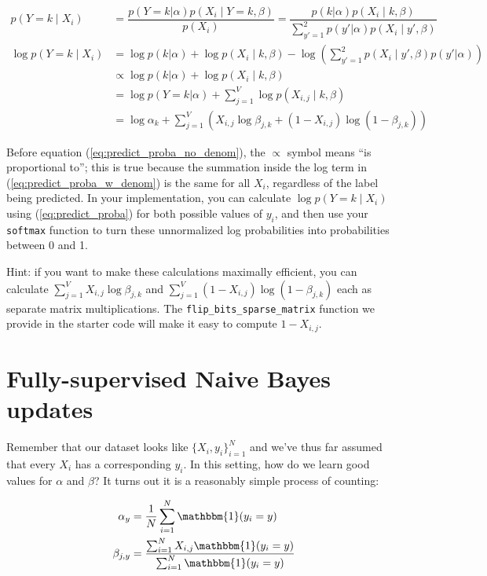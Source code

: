 \documentclass[12pt]{article}
\begin{document}
\begin{align}
p(Y=k \mid X_i) &= \dfrac{p(Y=k | \alpha)p(X_i \mid Y=k, \beta)}{p(X_i)}
= \dfrac{p(k | \alpha)p(X_i \mid k, \beta)}{\sum_{y'=1}^2 p(y' | \alpha)p(X_i \mid y', \beta)}
\label{eq:sup_prediction} \\[0.2em]
\log p(Y=k \mid X_i) &= \log p(k | \alpha) + \log p(X_i \mid k, \beta)  -
\log\left(\sum_{y'=1}^2 p(X_i \mid y', \beta)p(y' | \alpha)\right) \label{eq:predict_proba_w_denom} \\
&\propto \log p(k | \alpha) + \log p(X_i \mid k, \beta) \label{eq:predict_proba_no_denom} \\
&= \log p(Y=k | \alpha) + \sum_{j=1}^V \log p(X_{i,j} \mid k, \beta) \nonumber \\
&= \log \alpha_{k} + \sum_{j=1}^V \left(X_{i, j} \log \beta_{j, k} + (1 - X_{i, j}) \log (1 - \beta_{j, k}) \right)
\label{eq:predict_proba}
\end{align}

Before equation (\ref{eq:predict_proba_no_denom}), the $\propto$ symbol means
``is proportional to''; this is true because the summation inside the log term
in (\ref{eq:predict_proba_w_denom}) is the same for all $X_i$, regardless of
the label being predicted. In your implementation, you can calculate $\log
p(Y=k \mid X_i)$ using (\ref{eq:predict_proba}) for both possible values of
$y_i$, and then use your {\tt softmax} function to turn these unnormalized log
probabilities into probabilities between 0 and 1.

Hint: if you want to make these calculations maximally efficient, you can
calculate $\sum_{j=1}^V X_{i, j} \log \beta_{j, k}$ and $\sum_{j=1}^V (1
- X_{i, j}) \log (1 - \beta_{j, k})$ each as separate matrix multiplications.
The {\tt flip\_bits\_sparse\_matrix} function we provide in the starter code will
make it easy to compute $1 - X_{i, j}$.

\section{Fully-supervised Naive Bayes updates}

Remember that our dataset looks like $\{X_i, y_i\}_{i=1}^N$ and we've thus far
assumed that every $X_i$ has a corresponding $y_i$. In this setting, how do we
learn good values for $\alpha$ and $\beta$? It turns out it is a reasonably
simple process of counting:

\begin{align}
\alpha_y &= \frac{1}{N} \sum_{i=1}^N \mathbbm{1}(y_i = y) \label{eq:sup_alpha} \\
\beta_{j, y} &= \dfrac{\sum_{i=1}^N X_{i, j} \mathbbm{1}(y_i = y)}{\sum_{i=1}^N
\mathbbm{1}(y_i = y)}\label{eq:sup_beta}
\end{align}
\end{document}
